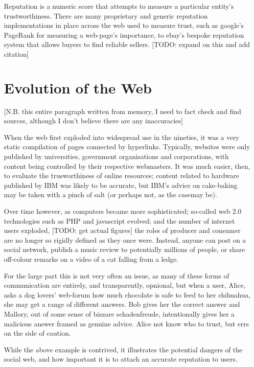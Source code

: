 \documentclass[]{final_report}
\begin{document}
Reputation is a numeric score that attempts to measure a particular entity's trustworthiness. There are many proprietary and generic reputation implementations in place across the web used to measure trust, such as google's PageRank for measuring a web-page's importance, to ebay's bespoke reputation system that allows buyers to find reliable sellers. [TODO: expand on this and add citation]

\section{Evolution of the Web}

[N.B. this entire paragraph written from memory, I need to fact check and find sources, although I don't believe there are any inaccuracies]

When the web first exploded into widespread use in the nineties, it was a very static compilation of pages connected by hyperlinks. Typically, websites were only published by universities, government organisations and corporations, with content being controlled by their respective webmasters. It was much easier, then, to evaluate the trusworthiness of online resources; content related to hardware published by IBM was likely to be accurate, but IBM's advice on cake-baking may be taken with a pinch of salt (or perhaps not, as the casemay be).

Over time however, as computers became more sophisticated; so-called web 2.0 technologies such as PHP and javascript evolved; and the number of internet users exploded, [TODO: get actual figures] the roles of producer and consumer are no longer so rigidly defined as they once were. Instead, anyone can post on a social network, publish a music review to potentially millions of people, or share off-colour remarks on a video of a cat falling from a ledge.

For the large part this is not very often an issue, as many of these forms of communication are entirely, and transparently, opnional, but when a user, Alice, asks a dog lovers' web-forum how much chocolate is safe to feed to her chihuahua, she may get a range of different answers. Bob gives her the correct answer and Mallory, out of some sense of bizzare schadenfreude, intentionally gives her a malicious answer framed as genuine advice. Alice not know who to trust, but errs on the side of caution.

While the above example is contrived, it illustrates the potential dangers of the social web, and how important it is to attach an accurate reputation to users.
\end{document}
